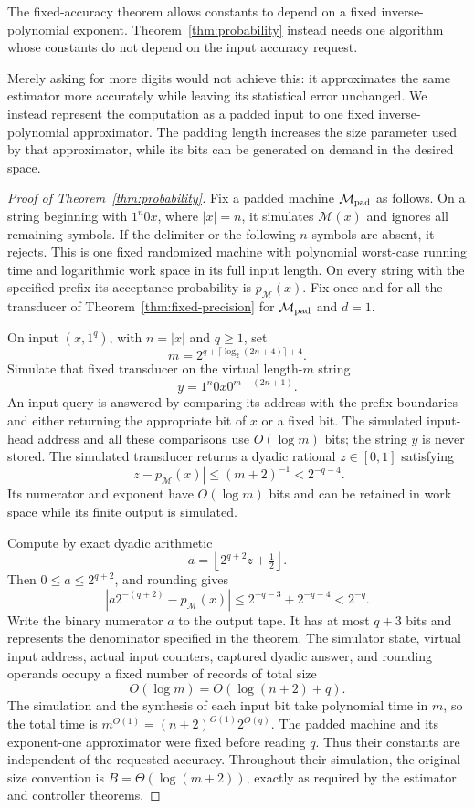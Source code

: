 The fixed-accuracy theorem allows constants to depend on a fixed inverse-polynomial exponent. Theorem~\ref{thm:probability} instead needs one algorithm whose constants do not depend on the input accuracy request.

Merely asking for more digits would not achieve this: it approximates the same estimator more accurately while leaving its statistical error unchanged. We instead represent the computation as a padded input to one fixed inverse-polynomial approximator. The padding length increases the size parameter used by that approximator, while its bits can be generated on demand in the desired space.

\begin{proof}[Proof of Theorem~\ref{thm:probability}]
Fix a padded machine $\mathcal M_{\rm pad}$ as follows. On a string
beginning with $1^n0x$, where $|x|=n$, it simulates $\mathcal M(x)$
and ignores all remaining symbols. If the delimiter or the following
$n$ symbols are absent, it rejects. This is one fixed randomized
machine with polynomial worst-case running time and logarithmic work
space in its full input length. On every string with the specified
prefix its acceptance probability is $p_{\mathcal M}(x)$.
Fix once and for all the transducer of
Theorem~\ref{thm:fixed-precision} for $\mathcal M_{\rm pad}$ and $d=1$.

On input $(x,1^q)$, with $n=|x|$ and $q\ge1$, set
\[
 m=2^{q+\lceil\log_2(2n+4)\rceil+4}.
\]
Simulate that fixed transducer on the virtual length-$m$ string
\[
 y=1^n0x0^{m-(2n+1)}.
\]
An input query is answered by comparing its address with the prefix
boundaries and either returning the appropriate bit of $x$ or a
fixed bit. The simulated input-head address and all these comparisons
use $O(\log m)$ bits; the string $y$ is never stored. The simulated
transducer returns a dyadic rational $z\in[0,1]$ satisfying
\[
 |z-p_{\mathcal M}(x)|\le(m+2)^{-1}<2^{-q-4}.
\]
Its numerator and exponent have $O(\log m)$ bits and can be retained
in work space while its finite output is simulated.

Compute by exact dyadic arithmetic
\[
 a=\left\lfloor 2^{q+2}z+\tfrac12\right\rfloor.
\]
Then $0\le a\le2^{q+2}$, and rounding gives
\[
 \left|a2^{-(q+2)}-p_{\mathcal M}(x)\right|
 \le2^{-q-3}+2^{-q-4}<2^{-q}.
\]
Write the binary numerator $a$ to the output tape. It has at most
$q+3$ bits and represents the denominator specified in the theorem.
The simulator state, virtual input address, actual input counters,
captured dyadic answer, and rounding operands occupy a fixed number
of records of total size
\[
 O(\log m)=O(\log(n+2)+q).
\]
The simulation and the synthesis of each input bit take polynomial
time in $m$, so the total time is
$m^{O(1)}=(n+2)^{O(1)}2^{O(q)}$.
The padded machine and its exponent-one approximator were fixed
before reading $q$. Thus their constants are independent of the
requested accuracy. Throughout their simulation, the original size
convention is $B=\Theta(\log(m+2))$, exactly as required by the
estimator and controller theorems.
\end{proof}

